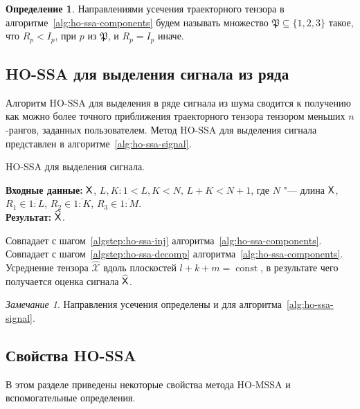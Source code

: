 \documentclass[specialist,
  substylefile=spbu_report.rtx,
subf,href,colorlinks=true, 12pt]{disser}
\theoremstyle{plain}
\theoremstyle{definition}
\newtheorem{definition}{Определение}[section]
\theoremstyle{remark}
\newtheorem{remark}{Замечание}[section]
\newcommand{\Input}{\textbf{Входные данные: }}
\newcommand{\Output}{\textbf{Результат: }}
\begin{document}
\begin{definition}
  Направлениями усечения траекторного тензора в
  алгоритме~\ref{alg:ho-ssa-components}
  будем называть множество $\mathfrak{P}\subseteq \{1, 2, 3\}$ такое, что
  $R_p < I_p$, при $p$ из $\mathfrak{P}$, и $R_p = I_p$ иначе.
\end{definition}

\subsection{HO-SSA для выделения сигнала из ряда}\label{subsec:ho-ssa-signal}
Алгоритм HO-SSA для выделения в ряде сигнала из шума сводится к получению
как можно более точного приближения траекторного тензора тензором
меньших $n$-рангов, заданных пользователем.
Метод HO-SSA для выделения сигнала представлен в
алгоритме~\ref{alg:ho-ssa-signal}.
\begin{algorithm}[!ht]
  \caption{HO-SSA для выделения сигнала.}
  \label{alg:ho-ssa-signal}
  \Input $\mathsf{X}$, $L,K: 1< L,K < N,\, L + K < N + 1$, где $N$ "---
  длина $\mathsf{X}$, $R_1 \in \overline{1:L}$,
  $R_2 \in \overline{1:K}$, $R_3 \in \overline{1:M}$.\\
  \Output $\widehat{\mathsf{X}}$.

  \begin{algorithmic}[1]
    \State Совпадает с шагом~\ref{algstep:ho-ssa-inj}
    алгоритма~\ref{alg:ho-ssa-components}.
    \State Совпадает с шагом~\ref{algstep:ho-ssa-decomp}
    алгоритма~\ref{alg:ho-ssa-components}.
    \State
    Усреднение тензора $\widehat{\mathcal{X}}$ вдоль плоскостей
    $l+k+m=\operatorname{const}$,
    в результате чего получается оценка сигнала $\widehat{\mathsf{X}}$.
  \end{algorithmic}
\end{algorithm}

\begin{remark}
  Направления усечения определены и для алгоритма~\ref{alg:ho-ssa-signal}.
\end{remark}

\subsection{Свойства HO-SSA}
В этом разделе приведены некоторые свойства метода HO-MSSA и
вспомогательные определения.
\end{document}

